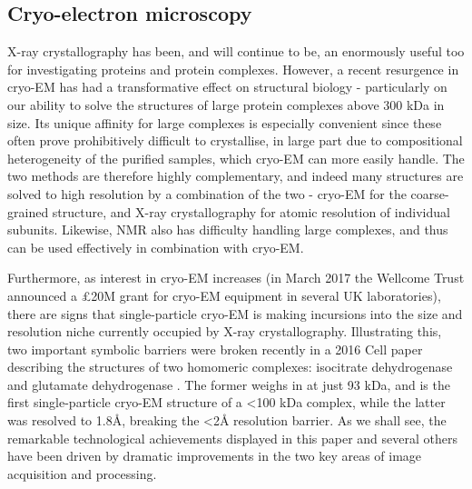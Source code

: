 \documentclass[a4paper,11pt,twoside,openright]{scrbook}
\begin{document}
\subsection{Cryo-electron microscopy}
X-ray crystallography has been, and will continue to be, an enormously useful too for investigating proteins and protein complexes. However, a recent resurgence in cryo-EM has had a transformative effect on structural biology - particularly on our ability to solve the structures of large protein complexes above 300 kDa in size. Its unique affinity for large complexes is especially convenient since these often prove prohibitively difficult to crystallise, in large part due to compositional heterogeneity of the purified samples, which cryo-EM can more easily handle. The two methods are therefore highly complementary, and indeed many structures are solved to high resolution by a combination of the two - cryo-EM for the coarse-grained structure, and X-ray crystallography for atomic resolution of individual subunits. Likewise, NMR also has difficulty handling large complexes, and thus can be used effectively in combination with cryo-EM.

Furthermore, as interest in cryo-EM increases (in March 2017 the Wellcome Trust announced a £20M grant for cryo-EM equipment in several UK laboratories), there are signs that single-particle cryo-EM is making incursions into the size and resolution niche currently occupied by X-ray crystallography. Illustrating this, two important symbolic barriers were broken recently in a 2016 Cell paper describing the structures of two homomeric complexes: isocitrate dehydrogenase and glutamate dehydrogenase \cite{Merk2016}. The former weighs in at just 93 kDa, and is the first single-particle cryo-EM structure of a <100 kDa complex, while the latter was resolved to 1.8Å, breaking the <2Å resolution barrier. As we shall see, the remarkable technological achievements displayed in this paper and several others have been driven by dramatic improvements in the two key areas of image acquisition and processing\cite{Bai2015}.
\end{document}
